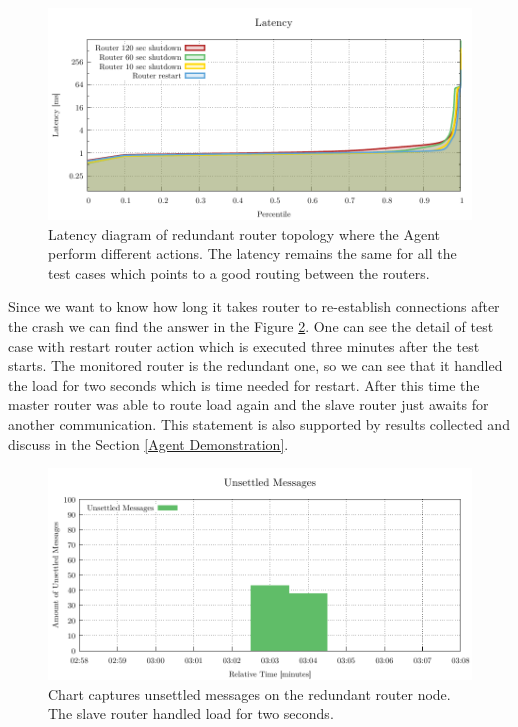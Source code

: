 \begin{figure}[H]
	\centering
	\includegraphics[width=1\linewidth]{obrazky-figures/charts/agent-redundant-latency.pdf}
	\caption{Latency diagram of redundant router topology where the Agent perform different actions. The latency remains the same for all the test cases which points to a good routing between the routers.}
	\label{fig:agent-redundant-latency}
\end{figure}

Since we want to know how long it takes router to re-establish connections after the crash we can find the answer in the Figure \ref{fig:agent-redundant-unpressetled}. One can see the detail of test case with restart router action which is executed three minutes after the test starts. The monitored router is the redundant one, so we can see that it handled the load for two seconds which is time needed for restart. After this time the master router was able to route load again and the slave router just awaits for another communication. This statement is also supported by results collected and discuss in the Section \ref{Agent Demonstration}.

\begin{figure}[H]
	\centering
	\includegraphics[width=1\linewidth]{obrazky-figures/charts/restart-redundant-agent-routerLink.pdf}
	\caption{Chart captures unsettled messages on the redundant router node. The slave router handled load for two seconds.}
	\label{fig:agent-redundant-unpressetled}
\end{figure}

